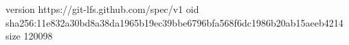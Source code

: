 version https://git-lfs.github.com/spec/v1
oid sha256:11e832a30bd8a38da1965b19ec39bbe6796bfa568f6dc1986b20ab15aeeb4214
size 120098
